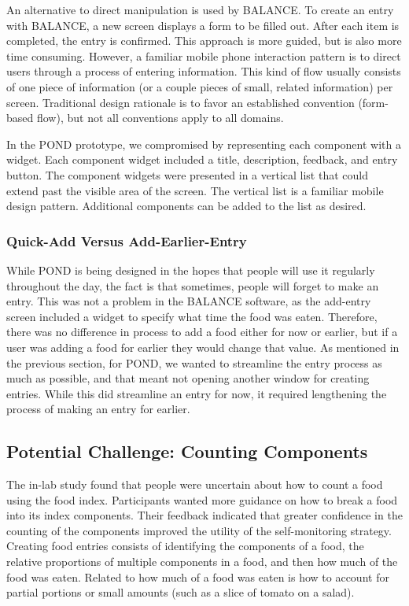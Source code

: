 An alternative to direct manipulation is used by BALANCE. To create an entry with BALANCE, a new screen displays a form to be filled out. After each item is completed, the entry is confirmed. This approach is more guided, but is also more time consuming. However, a familiar mobile phone interaction pattern is to direct users through a process of entering information. This kind of flow usually consists of one piece of information (or a couple pieces of small, related information) per screen. Traditional design rationale is to favor an established convention (form-based flow), but not all conventions apply to all domains. 

In the POND prototype, we compromised by representing each component with a widget. Each component widget included a title, description, feedback, and entry button. The component widgets were presented in a vertical list that could extend past the visible area of the screen. The vertical list is a familiar mobile design pattern. Additional components can be added to the list as desired. 

\subsubsection{Quick-Add Versus Add-Earlier-Entry}

While POND is being designed in the hopes that people will use it regularly throughout the day, the fact is that sometimes, people will forget to make an entry. This was not a problem in the BALANCE software, as the add-entry screen included a widget to specify what time the food was eaten. Therefore, there was no difference in process to add a food either for now or earlier, but if a user was adding a food for earlier they would change that value. As mentioned in the previous section, for POND, we wanted to streamline the entry process as much as possible, and that meant not opening another window for creating entries. While this did streamline an entry for now, it required lengthening the process of making an entry for earlier. 

\subsection{Potential Challenge: Counting Components}
The in-lab study found that people were uncertain about how to count a food using the food index. Participants wanted more guidance on how to break a food into its index components. Their feedback indicated that greater confidence in the counting of the components improved the utility of the self-monitoring strategy. Creating food entries consists of identifying the components of a food, the relative proportions of multiple components in a food, and then how much of the food was eaten. Related to how much of a food was eaten is how to account for partial portions or small amounts (such as a slice of tomato on a salad). 


